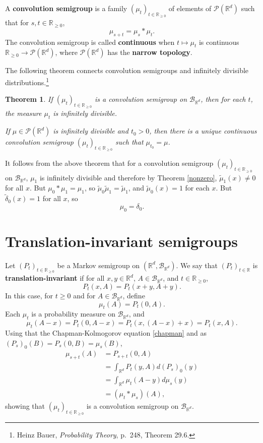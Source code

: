 \documentclass{article}
\newtheorem{theorem}{Theorem}
\theoremstyle{definition}
\begin{document}
A \textbf{convolution semigroup} is a family $(\mu_t)_{t \in \mathbb{R}_{\geq 0}}$ of elements
of $\mathscr{P}(\mathbb{R}^d)$ such that 
for $s,t \in \mathbb{R}_{\geq 0}$,
\[
\mu_{s+t} = \mu_s * \mu_t.
\]
The convolution semigroup is called \textbf{continuous} when $t \mapsto \mu_t$
is continuous $\mathbb{R}_{\geq 0} \to \mathscr{P}(\mathbb{R}^d)$, where $\mathscr{P}(\mathbb{R}^d)$
has the \textbf{narrow topology}.

The following theorem connects convolution semigroups and infinitely divisible distributions.\footnote{Heinz
Bauer, {\em Probability Theory}, p.~248, Theorem 29.6.}

\begin{theorem}
If $(\mu_t)_{t \in \mathbb{R}_{\geq 0}}$ is a convolution semigroup on
$\mathscr{B}_{\mathbb{R}^d}$, then for each
$t$, the measure $\mu_t$ is infinitely divisible. 

If $\mu \in \mathscr{P}(\mathbb{R}^d)$ is infinitely divisible and $t_0>0$, then there is a unique continuous convolution
semigroup $(\mu_t)_{t \in \mathbb{R}_{\geq 0}}$ such that $\mu_{t_0}=\mu$. 
\end{theorem}

It follows from the above theorem that for a convolution semigroup $(\mu_t)_{t \in \mathbb{R}_{\geq 0}}$
on $\mathscr{B}_{\mathbb{R}^d}$,
$\mu_1$ is infinitely divisible and therefore by Theorem \ref{nonzero}, $\tilde{\mu}_1(x) \neq 0$ for all $x$.
But $\mu_0 * \mu_1 = \mu_1$, so $\tilde{\mu}_0 \tilde{\mu}_1 = \tilde{\mu}_1$, and $\tilde{\mu}_0(x)=1$ for each
$x$. But $\tilde{\delta}_0(x)=1$ for all $x$, so
\begin{equation}
\mu_0=\delta_0.
\label{delta0}
\end{equation}


\section{Translation-invariant semigroups}
Let $(P_t)_{t \in \mathbb{R}_{\geq 0}}$ be a Markov semigroup on $(\mathbb{R}^d,\mathscr{B}_{\mathbb{R}^d})$.
We say that $(P_t)_{t \in \mathbb{R}}$ is \textbf{translation-invariant} if for all
$x,y \in \mathbb{R}^d$, $A \in \mathscr{B}_{\mathbb{R}^d}$, and $t \in \mathbb{R}_{\geq 0}$,
\[
P_t(x,A) = P_t(x+y,A+y).
\]
In this case, for $t \geq 0$ and for $A \in \mathscr{B}_{\mathbb{R}^d}$, define
\[
\mu_t(A) = P_t(0,A).
\]
Each $\mu_t$ is a probability measure on $\mathscr{B}_{\mathbb{R}^d}$, and
\[
\mu_t(A-x) = P_t(0,A-x) = P_t(x,(A-x)+x) = P_t(x,A).
\]
Using that the Chapman-Kolmogorov equation \eqref{chapman} and as
$(P_s)_0(B)=P_s(0,B)=\mu_s(B)$,
\begin{align*}
\mu_{s+t}(A)&=P_{s+t}(0,A)\\
&=\int_{\mathbb{R}^d} P_t(y,A) d(P_s)_0(y)\\
&=\int_{\mathbb{R}^d} \mu_t(A-y) d\mu_s(y)\\
&=(\mu_t * \mu_s)(A),
\end{align*}
showing that $(\mu_t)_{t \in \mathbb{R}_{\geq 0}}$ is a convolution semigroup on $\mathscr{B}_{\mathbb{R}^d}$.
\end{document}
